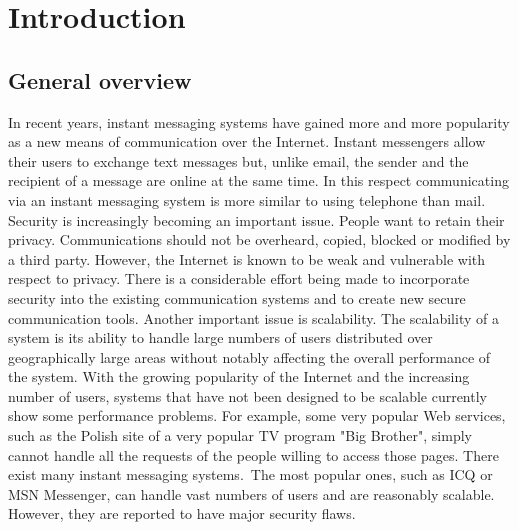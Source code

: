 
\chapter{Introduction}\label{ch:introduction}


\newcommand{\keyword}[1]{\textbf{#1}}
\newcommand{\tabhead}[1]{\textbf{#1}}
\newcommand{\code}[1]{\texttt{#1}}
\newcommand{\file}[1]{\texttt{\bfseries#1}}
\newcommand{\option}[1]{\texttt{\itshape#1}}



\section{General overview}\label{sec:general-overview}
In recent years, instant messaging systems have gained more and more popularity as a new means of communication over the Internet.
Instant messengers allow their users to exchange text messages but, unlike email, the sender and the recipient
of a message are online at the same time.
In this respect communicating via an instant messaging system is more similar to using telephone than mail.
Security is increasingly becoming an important issue.
People want to retain their privacy.
Communications should not be overheard, copied, blocked or modified by a third party.
However, the Internet is known to be weak and vulnerable with respect to privacy.
There is a considerable effort being made to incorporate security into the existing communication systems and to
create new secure communication tools.
Another important issue is scalability.
The scalability of a system is its ability to handle large numbers of users distributed over geographically
large areas without notably affecting the overall performance of the system.
With the growing popularity of the Internet and the increasing number of users, systems that have not been designed
to be scalable currently show some performance problems.
For example, some very popular Web services, such as the Polish site of a very popular TV program "Big Brother",
simply cannot handle all the requests of the people willing to access those pages.
There exist many instant messaging systems.\ The most popular ones, such as ICQ or MSN Messenger, can handle vast
numbers of users and are reasonably scalable.
However, they are reported to have major security flaws.
